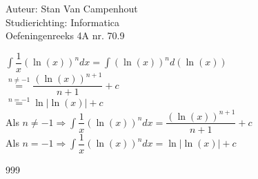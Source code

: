 \documentclass[a4paper]{article}
\begin{document}
  
\noindent \large Auteur: Stan Van Campenhout \\
\noindent \large Studierichting:  Informatica\\
\noindent \large Oefeningenreeks 4A nr. 70.9\\

\medskip

\normalsize

$ \displaystyle\int\dfrac{1}{x}\left(\ln\left(x\right)\right)^ndx = \displaystyle\int\left(\ln\left(x\right)\right)^nd\left(\ln\left(x\right)\right) $\\

$ \stackrel{n \not= -1}{=} \dfrac{\left(\ln\left(x\right)\right)^{n+1}}{n+1} + c $\\

$ \stackrel{n = -1}{=} \ln\left|\ln\left(x\right)\right| + c $\\

Als $ n \not= -1 \Rightarrow  \displaystyle\int\dfrac{1}{x}\left(\ln\left(x\right)\right)^ndx = \dfrac{\left(\ln\left(x\right)\right)^{n+1}}{n+1} + c $\\

Als $ n = -1 \Rightarrow \displaystyle\int\dfrac{1}{x}\left(\ln\left(x\right)\right)^ndx = \ln\left|\ln\left(x\right)\right| + c $\\

\begin{thebibliography}{999}
\end{thebibliography}
\end{document}
